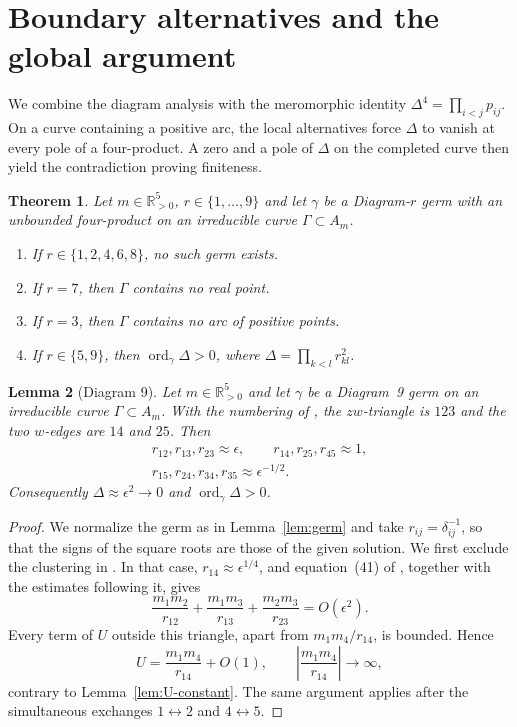 \documentclass[Threeside,11pt]{article}
\newtheorem{theorem}{Theorem}[section]
\newtheorem{lemma}[theorem]{Lemma}
\theoremstyle{definition}
\theoremstyle{remark}
\numberwithin{equation}{section}
\theoremstyle{remark}
\newcommand{\Rp}{\mathbb{R}_{>0}}
\newcommand{\ord}{\operatorname{ord}}
\newenvironment{alphalist}{\begin{enumerate}\renewcommand{\labelenumi}{(\alph{enumi})}%
  \renewcommand{\theenumi}{\alph{enumi}}}{\end{enumerate}}
\begin{document}
{
\section{Boundary alternatives and the global argument}\label{sec:exclusion}

We combine the diagram analysis with the meromorphic identity
$\Delta^4=\prod_{i<j}p_{ij}$.  On a curve containing a positive arc, the local alternatives
force $\Delta$ to vanish at every pole of a four-product.  A zero and a pole of $\Delta$
on the completed curve then yield the contradiction proving finiteness.

\begin{theorem}\label{thm:exclusion}
Let $m\in\Rp^5$, $r\in\{1,\dots,9\}$ and let $\gamma$ be a Diagram-$r$ germ with an unbounded
four-product on an irreducible curve $\Gamma\subset A_m$.
\begin{alphalist}
  \item If $r\in\{1,2,4,6,8\}$, no such germ exists.
  \item If $r=7$, then $\Gamma$ contains no real point.
  \item If $r=3$, then $\Gamma$ contains no arc of positive points.
  \item If $r\in\{5,9\}$, then $\ord_\gamma\Delta>0$, where $\Delta=\prod_{k<l}r_{kl}^2$.
\end{alphalist}
\end{theorem}


\begin{lemma}[Diagram 9]\label{lem:d9-product}
Let $m\in\Rp^5$ and let $\gamma$ be a Diagram~9 germ on an irreducible curve
$\Gamma\subset A_m$.  With the numbering of \cite[\S\S7.5.1.2 and~8.9]{AK}, the
$zw$-triangle is $123$ and the two $w$-edges are $14$ and $25$.  Then
\begin{equation}\label{eq:d9-distances}
\begin{gathered}
 r_{12},r_{13},r_{23}\approx\epsilon,\qquad
 r_{14},r_{25},r_{45}\approx1,\\
 r_{15},r_{24},r_{34},r_{35}\approx\epsilon^{-1/2}.
\end{gathered}
\end{equation}
Consequently $\Delta\approx\epsilon^2\to0$ and $\ord_\gamma\Delta>0$.
\end{lemma}

\begin{proof}
We normalize the germ as in Lemma~\ref{lem:germ} and take $r_{ij}=\delta_{ij}^{-1}$,
so that the signs of the square roots are those of the given solution.
We first exclude the clustering in \cite[\S8.9.1]{AK}.  In that case,
$r_{14}\approx\epsilon^{1/4}$, and equation~(41) of \cite{AK}, together with the
estimates following it, gives
\[
 \frac{m_1m_2}{r_{12}}+\frac{m_1m_3}{r_{13}}+
 \frac{m_2m_3}{r_{23}}=O(\epsilon^2).
\]
Every term of $U$ outside this triangle, apart from $m_1m_4/r_{14}$, is bounded.  Hence
\[
 U=\frac{m_1m_4}{r_{14}}+O(1),\qquad
 \left|\frac{m_1m_4}{r_{14}}\right|\longrightarrow\infty,
\]
contrary to Lemma~\ref{lem:U-constant}.  The same argument applies after the
simultaneous exchanges $1\leftrightarrow2$ and $4\leftrightarrow5$.


\end{proof}}
\end{document}
